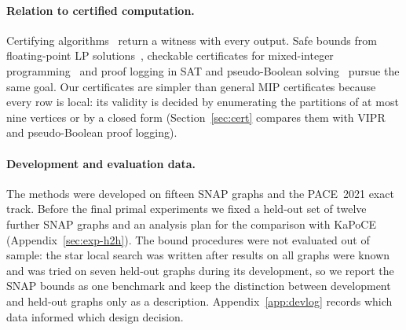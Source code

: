 \paragraph{Relation to certified computation.}  Certifying
algorithms~\cite{McConnellMNS11} return a witness with every output.  Safe
bounds from floating-point LP solutions~\cite{NeumaierS04safe,SteffyW13valid},
checkable certificates for mixed-integer programming~\cite{CheungGS17vipr}
and proof logging in SAT and pseudo-Boolean solving~\cite{WetzlerHH14drat,
GochtN21veripb} pursue the same goal.  Our certificates are simpler than
general MIP certificates because every row is local: its validity is decided
by enumerating the partitions of at most nine vertices or by a closed form
(Section~\ref{sec:cert} compares them with VIPR and pseudo-Boolean proof
logging).

\paragraph{Development and evaluation data.}  The methods were developed on
fifteen SNAP graphs and the PACE~2021 exact track.  Before the final primal
experiments we fixed a held-out set of twelve further SNAP graphs and an
analysis plan for the comparison with KaPoCE (Appendix~\ref{sec:exp-h2h}).
The bound procedures were not evaluated out of sample: the star local search
was written after results on all graphs were known and was tried on seven
held-out graphs during its development, so we report the SNAP bounds as one
benchmark and keep the distinction between development and held-out graphs
only as a description.
Appendix~\ref{app:devlog} records which data informed which design decision.
